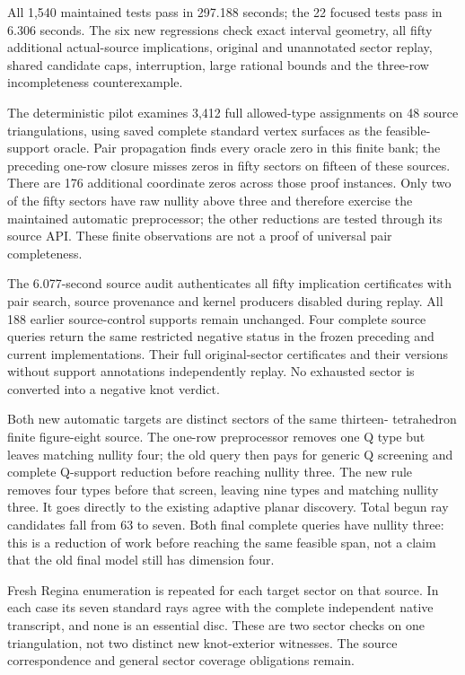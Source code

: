 All 1,540 maintained tests pass in 297.188 seconds; the 22 focused tests pass
in 6.306 seconds. The six new regressions check exact interval geometry,
all fifty additional actual-source implications, original and unannotated
sector replay, shared candidate caps, interruption, large rational bounds
and the three-row incompleteness counterexample.

The deterministic pilot examines 3,412 full allowed-type assignments on
48 source triangulations, using saved complete standard vertex surfaces
as the feasible-support oracle. Pair propagation finds every oracle zero
in this finite bank; the preceding one-row closure misses zeros in fifty
sectors on fifteen of these sources. There are 176 additional coordinate
zeros across those proof instances. Only two of the fifty sectors have raw
nullity above three and therefore exercise the maintained automatic
preprocessor; the other reductions are tested through its source API.
These finite observations are not a proof of universal pair completeness.

The 6.077-second source audit authenticates all fifty implication certificates
with pair search, source provenance and kernel producers disabled during
replay. All 188 earlier source-control supports remain unchanged. Four
complete source queries return the same restricted negative status in the
frozen preceding and current implementations. Their full original-sector
certificates and their versions without support annotations independently
replay. No exhausted sector is converted into a negative knot verdict.

Both new automatic targets are distinct sectors of the same thirteen-
tetrahedron finite figure-eight source. The one-row preprocessor removes
one Q type but leaves matching nullity four; the old query then pays for
generic Q screening and complete Q-support reduction before reaching
nullity three. The new rule removes four types before that screen, leaving
nine types and matching nullity three. It goes directly to the existing
adaptive planar discovery. Total begun ray candidates fall from 63 to seven.
Both final complete queries have nullity three: this is a reduction of work
before reaching the same feasible span, not a claim that the old final
model still has dimension four.

Fresh Regina enumeration is repeated for each target sector on that source.
In each case its seven standard rays agree with the complete independent
native transcript, and none is an essential disc. These are two sector
checks on one triangulation, not two distinct new knot-exterior witnesses.
The source correspondence and general sector coverage obligations remain.

